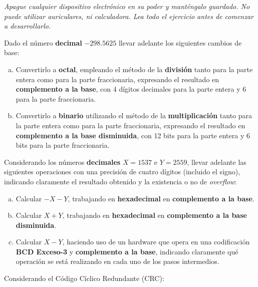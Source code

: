 \documentclass[12pt,a4paper]{article}
\begin{document}

\begin{center}
	\emph{Apague cualquier dispositivo electrónico en su poder y manténgalo guardado. No puede utilizar auriculares, ni calculadora. Lea todo el ejercicio antes de comenzar a desarrollarlo.}
\end{center}

Dado el número \textbf{decimal} $-298.5625$ llevar adelante los siguientes cambios de base:
\begin{enumerate}[a)]
	\item Convertirlo a \textbf{octal}, empleando el método de la \textbf{división} tanto para la parte entera como para la parte fraccionaria, expresando el resultado en \textbf{complemento a la base}, con 4 dígitos decimales para la parte entera y 6 para la parte fraccionaria.

	\item Convertirlo a \textbf{binario} utilizando el método de la \textbf{multiplicación} tanto para la parte entera como para la parte fraccionaria, expresando el resultado en \textbf{complemento a la base disminuida}, con 12 bits para la parte entera y 6 bits para la parte fraccionaria.
\end{enumerate}

Considerando los números {\textbf{decimales}} $X = 1537$ e $Y = 2559$, llevar adelante las siguientes operaciones con una precisión de cuatro dígitos (incluido el signo), indicando claramente el resultado obtenido y la existencia o no de \emph{overflow}:
\begin{enumerate}[a)]
	\item Calcular $- X - Y$, trabajando en \textbf{hexadecimal} en \textbf{complemento a la base}.
	\item Calcular $ X + Y $, trabajando en \textbf{hexadecimal} en \textbf{complemento a la base disminuida}.
	\item Calcular $X - Y$, haciendo uso de un hardware que opera en una codificación \textbf{BCD Exceso-3} y \textbf{complemento a la base}, indicando claramente qué operación se está realizando en cada uno de los pasos intermedios.
\end{enumerate}

 Considerando el Código Cíclico Redundante (CRC):
\end{document}

